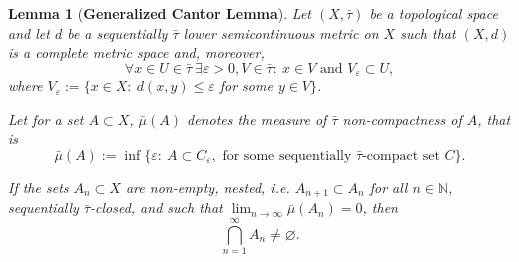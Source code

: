 \documentclass[12pt,leqno]{article}
\newtheorem{lem}[thm]{Lemma}          %
\theoremstyle{definition}
\theoremstyle{remark}
\def\ds{\displaystyle}
\begin{document}
\begin{lem}[\textbf{Generalized Cantor Lemma}]
    \label{lem:gen-cantor}
    Let $(X,\bar\tau)$ be a topological space and let $d$ be a sequentially $\bar\tau$ lower semicontinuous metric on $X$ such that $(X,d)$ is a complete metric space and, moreover,
    \begin{equation}
        \label{eq:tops-rshp}
        \forall x\in U \in \bar\tau\ \exists \varepsilon > 0,V\in\bar\tau:\ x\in V\text{ and } V_\varepsilon\subset U,
    \end{equation}
    where $V_\varepsilon := \{x\in X:\ d(x,y)\le\varepsilon$ for some $y\in V\}$.

    Let for a set $A\subset X$, $\bar\mu (A)$ denotes the measure of $\bar \tau$ non-compactness of $A$, that is
    $$
        \bar\mu (A) := \inf\{\varepsilon:\ A \subset C_\varepsilon,\text{ for some sequentially }\bar\tau \text{-compact set } C\}.
    $$

    If the sets $A_n\subset X$ are non-empty, nested, i.e. $A_{n+1}\subset A_n$ for all $n\in\mathbb{N}$, sequentially $\bar\tau$-closed, and such that
    $\ds
        \lim_{n\to\infty} \bar\mu(A_n) = 0$,
        then
    $$
        \bigcap_{n=1}^\infty A_n \neq \varnothing.
    $$
\end{lem}
\end{document}
